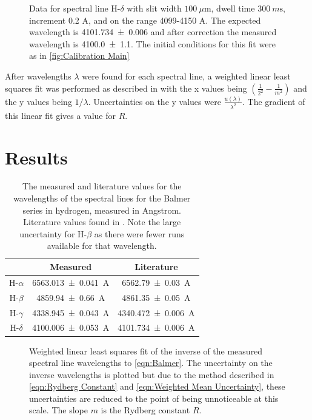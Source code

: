\documentclass[11pt]{article}
\numberwithin{equation}{section}
\numberwithin{figure}{section}
\numberwithin{table}{section}
\begin{document}
\begin{figure}[H]
    \begin{center}
       \caption{Data for spectral line H-$\delta$ with slit width $\SI{100}{\mu\m}$, dwell time $\SI{300}{m\second}$, increment 0.2 A, and on the range 4099-4150 A. The expected wavelength is \num{4101.734\pm0.006}\cite{Spectral Lines} and after correction the measured wavelength is \num{4100.0\pm1.1}. The initial conditions for this fit were as in \autoref{fig:Calibration Main}}
       \label{fig:DataMain}
    \end{center}
\end{figure}

\par After wavelengths $\lambda$ were found for each spectral line, a weighted linear least squares fit was performed as described in \cite{Kirkup} with the x values being $\left(\frac{1}{2^2}-\frac{1}{m^2}\right)$ and the y values being $1/\lambda$. Uncertainties on the y values were $\frac{u(\lambda)}{\lambda^2}$. The gradient of this linear fit gives a value for $R$.

\section{Results}\label{sec:Results}
\begin{table}[H]
    \centering
    \begin{tabular}{c|c|c}
         & Measured & Literature \\\hline
        H-$\alpha$ & \SI{6563.013\pm0.041}{A} & \SI{6562.79\pm0.03}{A} \\\hline
        H-$\beta$ & \SI{4859.94\pm0.66}{A} & \SI{4861.35\pm0.05}{A}\\\hline
        H-$\gamma$ & \SI{4338.945\pm0.043}{A} & \SI{4340.472\pm0.006}{A}\\\hline
        H-$\delta$ & \SI{4100.006\pm0.053}{A} & \SI{4101.734\pm0.006 }{A}
    \end{tabular}
    \caption{The measured and literature values for the wavelengths of the spectral lines for the Balmer series in hydrogen, measured in Angstrom. Literature values found in \cite{Spectral Lines}. Note the large uncertainty for H-$\beta$ as there were fewer runs available for that wavelength.}
    \label{tbl:Spectral Lines}
\end{table}

\begin{figure}[H]
    \begin{center}
       \caption{Weighted linear least squares fit of the inverse of the measured spectral line wavelengths to \autoref{eqn:Balmer}. The uncertainty on the inverse wavelengths is plotted but due to the method described in \autoref{eqn:Rydberg Constant} and \autoref{eqn:Weighted Mean Uncertainty}, these uncertainties are reduced to the point of being unnoticeable at this scale. The slope $m$ is the Rydberg constant $R$.}
       \label{fig:Fit}
    \end{center}
\end{figure}
\end{document}
